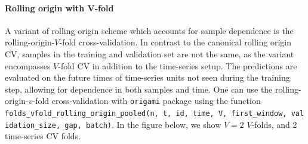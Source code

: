 \documentclass[12pt, krantz2,]{krantz}
\newenvironment{Shaded}{\begin{snugshade}}{\end{snugshade}}
\newcommand{\DecValTok}[1]{\textcolor[rgb]{0.06,0.06,0.06}{#1}}
\newcommand{\KeywordTok}[1]{\textcolor[rgb]{0.27,0.27,0.27}{\textbf{#1}}}
\newcommand{\NormalTok}[1]{#1}
\newcommand{\OperatorTok}[1]{\textcolor[rgb]{0.43,0.43,0.43}{\textbf{#1}}}
\newcommand{\StringTok}[1]{\textcolor[rgb]{0.5,0.5,0.5}{#1}}
\let\oldparagraph\paragraph
\renewcommand{\paragraph}[1]{\oldparagraph{#1}\mbox{}}
\theoremstyle{definition}
\theoremstyle{definition}
\theoremstyle{definition}
\newcommand{\1}{\mathbbm{1}}
\begin{document}
\begin{Shaded}
\end{Shaded}

\hypertarget{rolling-origin-with-v-fold}{%
\paragraph{Rolling origin with V-fold}\label{rolling-origin-with-v-fold}}

A variant of rolling origin scheme which accounts for sample dependence is the
rolling-origin-\(V\)-fold cross-validation. In contrast to the canonical rolling
origin CV, samples in the training and validation set are not the same, as the
variant encompasses \(V\)-fold CV in addition to the time-series setup. The
predictions are evaluated on the future times of time-series units not seen
during the training step, allowing for dependence in both samples and time. One
can use the rolling-origin-\(v\)-fold cross-validation with \texttt{origami} package
using the function \texttt{folds\_vfold\_rolling\_origin\_pooled(n,\ t,\ id,\ time,\ V,\ first\_window,\ validation\_size,\ gap,\ batch)}. In the figure below, we show \(V=2\)
\(V\)-folds, and 2 time-series CV folds.
\end{document}
